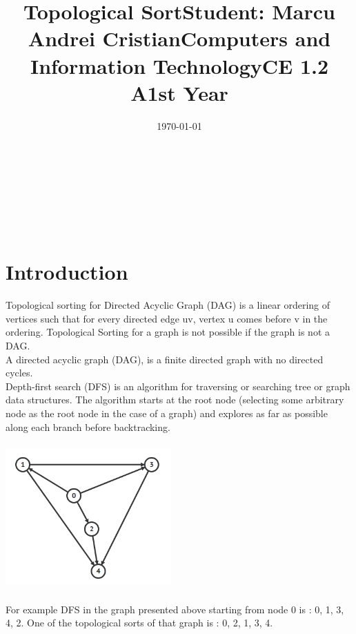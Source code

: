 \documentclass[14pt]{article}
\begin{document}
\title{\huge Topological Sort}
\date{\today}
\maketitle
\begin{center}
\vspace{30 mm}

\title{\huge Student: Marcu Andrei Cristian}
\\\vspace{10 mm}
\title{\huge Computers and Information Technology}
\\\vspace{10 mm}
\title{\huge CE 1.2 A}
\\\vspace{10 mm}
\title{\huge 1st Year}
\date{}
\maketitle

\newpage
\section*{Introduction}
\vspace{20 mm}
Topological sorting for Directed Acyclic Graph (DAG) is a linear ordering of vertices such that for every directed edge uv, vertex u comes before v in the ordering. Topological Sorting for a graph is not possible if the graph is not a DAG.
\\\vspace{10 mm}
A directed acyclic graph (DAG), is a finite directed graph with no directed cycles. 
\\\vspace{10 mm}
Depth-first search (DFS) is an algorithm for traversing or searching tree or graph data structures. The algorithm starts at the root node (selecting some arbitrary node as the root node in the case of a graph) and explores as far as possible along each branch before backtracking.
\\\vspace{10 mm}
\includegraphics[height=2.5in, width = 2.5in]{graf.png}
\\\vspace{10 mm}
For example DFS in the graph presented above starting from node 0 is : 0, 1, 3, 4, 2. One of the topological sorts of that graph is : 0, 2, 1, 3, 4.
\newpage
\end{center}
\end{document}
